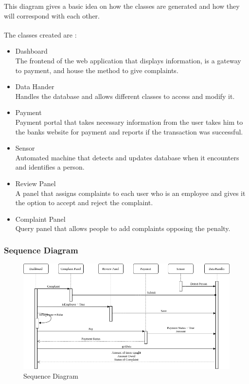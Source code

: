 \documentclass[10pt,twocolumn,letterpaper]{article}
\begin{document}
\noindent This diagram gives a basic idea on how the classes are generated 
and how they will correspond with each other.
\\\\
The classes created are :
\begin{itemize}
    \item Dashboard\\
    The frontend of the web application that displays information, is a gateway to 
    payment, and house the method to give complaints.
    \item Data Hander\\
    Handles the database and allows different classes to access and modify it.
    \item Payment\\
    Payment portal that takes necessary information from the user takes him to the 
    banks website for payment and reports if the transaction was successful.
    \item Sensor\\
    Automated machine that detects and updates database when it encounters and 
    identifies a person.
    \item Review Panel\\
    A panel that assigns complaints to each user who is an employee and gives 
    it the option to accept and reject the complaint.
    \item Complaint Panel \\
    Query panel that allows people to add complaints opposing the penalty.
\end{itemize}

\subsubsection*{Sequence Diagram}
\begin{figure}[h]
    \centering
    \includegraphics[scale=0.3]{img/Sequence Diagram.png}    
    \caption{Sequence Diagram}
\end{figure}
\end{document}
